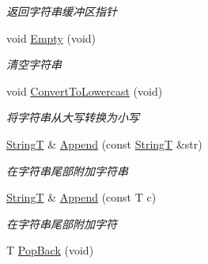 \begin{DoxyCompactItemize}
\begin{DoxyCompactList}\small\item\em 返回字符串缓冲区指针 \end{DoxyCompactList}\item 
void \hyperlink{class_util_1_1_string_t_aac8b361806b6c5995cc251bf1365f786}{Empty} (void)
\begin{DoxyCompactList}\small\item\em 清空字符串 \end{DoxyCompactList}\item 
void \hyperlink{class_util_1_1_string_t_ae53d9ce6fd8b1935c01d8dd59ee7e31d}{Convert\-To\-Lowercast} (void)
\begin{DoxyCompactList}\small\item\em 将字符串从大写转换为小写 \end{DoxyCompactList}\item 
\hyperlink{class_util_1_1_string_t}{String\-T} \& \hyperlink{class_util_1_1_string_t_aca66fa07a2bc4707b622d3af0def910b}{Append} (const \hyperlink{class_util_1_1_string_t}{String\-T} \&str)
\begin{DoxyCompactList}\small\item\em 在字符串尾部附加字符串 \end{DoxyCompactList}\item 
\hyperlink{class_util_1_1_string_t}{String\-T} \& \hyperlink{class_util_1_1_string_t_ae08a46946ebab1db4478d55055ed3ca8}{Append} (const T c)
\begin{DoxyCompactList}\small\item\em 在字符串尾部附加字符 \end{DoxyCompactList}\item 
\hypertarget{class_util_1_1_string_t_a9a0cdb55768faaa23d107ab89a5e7d99}{T \hyperlink{class_util_1_1_string_t_a9a0cdb55768faaa23d107ab89a5e7d99}{Pop\-Back} (void)}\label{class_util_1_1_string_t_a9a0cdb55768faaa23d107ab89a5e7d99}


\end{DoxyCompactItemize}
